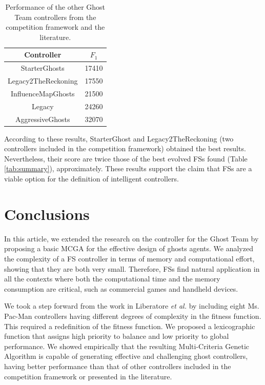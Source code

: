 \documentclass[journal]{IEEEtran}
\begin{document}
\begin{table} [!t]
\caption{Performance of the other Ghost Team controllers from the competition framework and the literature.}
\label{tab:summary_others}
\centering
\begin{tabular}{|c|c|}
\hline 
Controller & $F_1$ \\
\hline
StarterGhosts & 17410 \\
\hline
Legacy2TheReckoning & 17550 \\
\hline
InfluenceMapGhosts \cite{Svensson2012} & 21500 \\
\hline
Legacy & 24260 \\
\hline
AggressiveGhosts & 32070 \\
\hline
\end{tabular}
\end{table}

According to these results, StarterGhost and Legacy2TheReckoning (two controllers included in the competition framework) obtained the best results. Nevertheless, their score are twice those of the best evolved FSs found (Table \ref{tab:summary}), approximately. These results support the claim that FSs are a viable option for the definition of intelligent controllers.

\section{Conclusions}
\label{sec:Conclusions}
In this article, we extended the research on the controller for the Ghost Team by proposing a basic MCGA for the effective design of ghosts agents. We analyzed the complexity of a FS controller in terms of memory and computational effort, showing that they are both very small. Therefore, FSs find natural application in all the contexts where both the computational time and the memory consumption are critical, such as commercial games and handheld devices.

We took a step forward from the work in Liberatore \emph{et al.} \cite{Liberatore2014} by including eight Ms. Pac-Man controllers having different degrees of complexity in the fitness function. This required a redefinition of the fitness function. We proposed a lexicographic function that assigns high priority to balance and low priority to global performance. We showed empirically that the resulting Multi-Criteria Genetic Algorithm is capable of generating effective and challenging ghost controllers, having better performance than that of other controllers included in the competition framework or presented in the literature.
\end{document}
